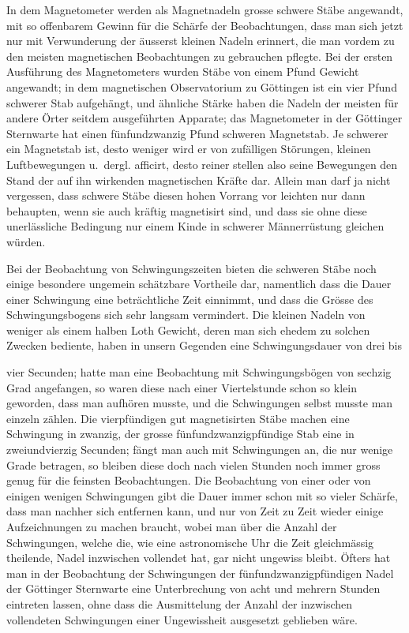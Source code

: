 In dem Magnetometer werden als Magnetnadeln grosse schwere Stäbe angewandt, mit so offenbarem Gewinn für die Schärfe der Beobachtungen, dass man sich jetzt nur mit Verwunderung der äusserst kleinen Nadeln erinnert, die man vordem zu den meisten magnetischen Beobachtungen zu gebrauchen pflegte. Bei der ersten Ausführung des Magnetometers wurden Stäbe von einem Pfund Gewicht angewandt; in dem magnetischen Observatorium zu Göttingen ist ein vier Pfund schwerer Stab aufgehängt, und ähnliche Stärke haben die Nadeln der meisten für andere Örter seitdem ausgeführten Apparate; das Magnetometer in der Göttinger Sternwarte hat einen fünfundzwanzig Pfund schweren Magnetstab. Je schwerer ein Magnetstab ist, desto weniger wird er von zufälligen Störungen, kleinen Luftbewegungen u.~dergl. afficirt, desto reiner stellen also seine Bewegungen den Stand der auf ihn wirkenden magnetischen Kräfte dar. Allein man darf ja nicht vergessen, dass schwere Stäbe diesen hohen Vorrang vor leichten nur dann behaupten, wenn sie auch kräftig magnetisirt sind, und dass sie ohne diese unerlässliche Bedingung nur einem Kinde in schwerer Männerrüstung gleichen würden.

Bei der Beobachtung von Schwingungszeiten bieten die schweren Stäbe noch einige besondere ungemein schätzbare Vortheile dar, namentlich dass die Dauer einer Schwingung eine beträchtliche Zeit einnimmt, und dass die Grösse des Schwingungsbogens sich sehr langsam vermindert. Die kleinen Nadeln von weniger als einem halben Loth Gewicht, deren man sich ehedem zu solchen Zwecken bediente, haben in unsern Gegenden eine Schwingungsdauer von drei bis
\par\clearpage
{}
\noindent vier Secunden; hatte man eine Beobachtung mit Schwingungsbögen von sechzig Grad angefangen, so waren diese nach einer Viertelstunde schon so klein geworden, dass man aufhören musste, und die Schwingungen selbst musste man einzeln zählen. Die vierpfündigen gut magnetisirten Stäbe machen eine Schwingung in zwanzig, der grosse fünfundzwanzigpfündige Stab eine in zweiundvierzig Secunden; fängt man auch mit Schwingungen an, die nur wenige Grade betragen, so bleiben diese doch nach vielen Stunden noch immer gross genug für die feinsten Beobachtungen. Die Beobachtung von einer oder von einigen wenigen Schwingungen gibt die Dauer immer schon mit so vieler Schärfe, dass man nachher sich entfernen kann, und nur von Zeit zu Zeit wieder einige Aufzeichnungen zu machen braucht, wobei man über die Anzahl der Schwingungen, welche die, wie eine astronomische Uhr die Zeit gleichmässig theilende, Nadel inzwischen vollendet hat, gar nicht ungewiss bleibt. Öfters hat man in der Beobachtung der Schwingungen der fünfundzwanzigpfündigen Nadel der Göttinger Sternwarte eine Unterbrechung von acht und mehrern Stunden eintreten lassen, ohne dass die Ausmittelung der Anzahl der inzwischen vollendeten Schwingungen einer Ungewissheit ausgesetzt geblieben wäre.

